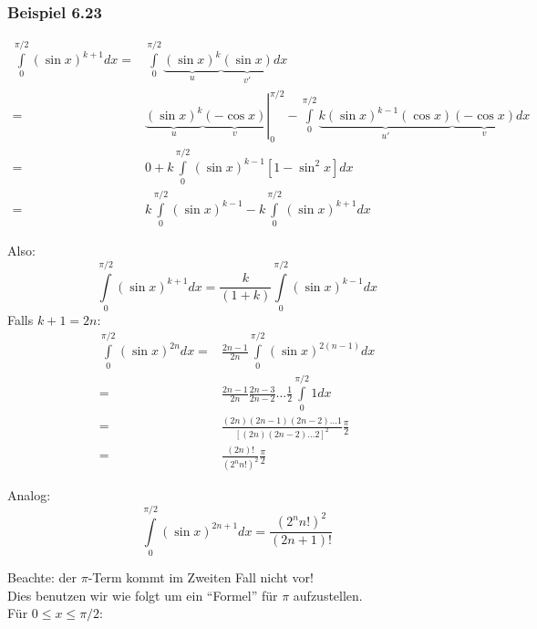 \subsubsection*{Beispiel 6.23}

\begin{align*}
\int\limits_0^{\pi /2} {(\sin x)^{k + 1}dx} =&\int\limits_0^{\pi /2} {\underbrace {{{(\sin x)}^k}}_u\underbrace {(\sin x)}_{v'}dx}  \\
=&\left. {\underbrace {{{(\sin x)}^k}}_u\underbrace {( - \cos x)}_v} \right|_0^{\pi /2} - \int\limits_0^{\pi /2} {\underbrace {k{{(\sin x)}^{k - 1}}(\cos x)}_{u'}} \underbrace {( - \cos x)}_vdx\\
=&0 + k\int\limits_0^{\pi /2} {{{(\sin x)}^{k - 1}}} \left[ {1 - {{\sin }^2}x} \right]dx\\
 =&k\int\limits_0^{\pi /2} {{{(\sin x)}^{k - 1}} - k\int\limits_0^{\pi /2} {{{(\sin x)}^{k + 1}}} dx}
\end{align*}

Also:
\[\int\limits_0^{\pi /2} {{{(\sin x)}^{k + 1}}dx = \frac{k}{{(1 + k)}}\int\limits_0^{\pi /2} {{{(\sin x)}^{k - 1}}dx} } \]
Falls $k+1=2n$:
\begin{align*}
\int\limits_0^{\pi /2} {(\sin x)}^{2n}dx =&\frac{2n - 1}{2n}\int\limits_0^{\pi /2} {{(\sin x)}^{2(n - 1)}}dx\\
 =&\frac{{2n - 1}}{{2n}}\frac{{2n - 3}}{{2n - 2}} \ldots \frac{1}{2}\int\limits_0^{\pi /2} {1dx} \\
 =&\frac{{(2n)(2n - 1)(2n - 2) \ldots 1}}{{{{\left[ {(2n)(2n - 2) \ldots 2} \right]}^2}}}\frac{\pi }{2}\\
 =&\frac{{(2n)!}}{{{{({2^n}n!)}^2}}}\frac{\pi }{2}
\end{align*}

\noindent Analog:
\[\int\limits_0^{\pi /2} {{{(\sin x)}^{2n + 1}}dx = \frac{{{{({2^n}n!)}^2}}}{{(2n + 1)!}}} \]

\noindent Beachte: der $\pi$-Term kommt im Zweiten Fall nicht vor!\\

\noindent Dies benutzen wir wie folgt um ein ``Formel'' für $\pi$ aufzustellen.\\

\noindent Für $0\leq x \leq\pi/2$:

